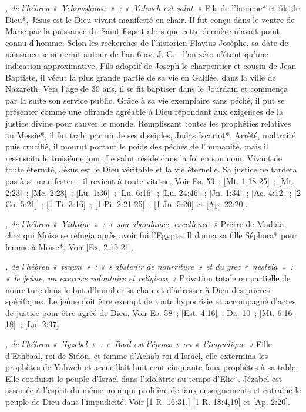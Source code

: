 \begin{multicols}{2}
\textit{, de l'hébreu «~Yehowshuwa~»~: «~Yahweh est salut~»}\newline
Fils de l'homme* et fils de Dieu*, Jésus est le Dieu vivant manifesté en chair. Il fut conçu dans le ventre de Marie par la puissance du Saint-Esprit alors que cette dernière n'avait point connu d'homme. Selon les recherches de l'historien Flavius Josèphe, sa date de naissance se situerait autour de l'an 6 av. J.-C. - l'an zéro n'étant qu'une indication approximative. Fils adoptif de Joseph le charpentier et cousin de Jean Baptiste, il vécut la plus grande partie de sa vie en Galilée, dans la ville de Nazareth. Vers l'âge de 30 ans, il se fit baptiser dans le Jourdain et commença par la suite son service public. Grâce à sa vie exemplaire sans péché, il put se présenter comme une offrande agréable à Dieu répondant aux exigences de la justice divine pour sauver le monde. Remplissant toutes les prophéties relatives au Messie*, il fut trahi par un de ses disciples, Judas Iscariot*. Arrêté, maltraité puis crucifié, il mourut portant le poids des péchés de l'humanité, mais il ressuscita le troisième jour. Le salut réside dans la foi en son nom. Vivant de toute éternité, Jésus est le Dieu véritable et la vie éternelle. Sa justice ne tardera pas à se manifester~: il revient à toute vitesse. Voir Es. 53~; \vref{Mt. 1:18-25}~; \vref{Mt. 2:23}~; \vref{Mc. 2:28}~; \vref{Lu. 1:36}~; \vref{Lu. 6:16}~; \vref{Lu. 24:46}~; \vref{Jn. 1:34}~; \vref{Ac. 4:12}~; \vref{2 Co. 5:21}~; \vref{1 Ti. 3:16}~; \vref{1 Pi. 2:21-25}~; \vref{1 Jn. 5:20} et \vref{Ap. 22:20}.

\textit{, de l'hébreu «~Yithrow~»~: «~son abondance, excellence~»}\newline
Prêtre de Madian chez qui Moise se réfugia après avoir fui l'Egypte. Il donna sa fille Séphora* pour femme à Moïse*. Voir \vref{Ex. 2:15-21}.

\textit{, de l'hébreu «~tsuwn~»~: «~s'abstenir de nourriture~» et du grec «~nesteia~»~: «~le jeûne, un exercice volontaire et religieux~»}\newline
Privation totale ou partielle de nourriture dans le but d'humilier sa chair et d'adresser à Dieu des prières spécifiques. Le jeûne doit être exempt de toute hypocrisie et accompagné d'actes de justice pour être agréé de Dieu. Voir Es. 58~; \vref{Est. 4:16}~; Da. 10~; \vref{Mt. 6:16-18}~; \vref{Lu. 2:37}.

\textit{, de l'hébreu «~'Iyzebel~»~: «~Baal est l'époux~» ou «~l'impudique~»}\newline
Fille d'Ethbaal, roi de Sidon, et femme d'Achab roi d'Israël, elle extermina les prophètes de Yahweh et accueillait huit cent cinquante faux prophètes à sa table. Elle conduisit le peuple d'Israël dans l'idolâtrie au temps d'Elie*. Jézabel est associée à l'esprit du même nom qui prolifère de faux enseignements et entraîne le peuple de Dieu dans l'impudicité. Voir \vref{1 R. 16:31,} \vref{1 R. 18:4,19} et \vref{Ap. 2:20}.


\end{multicols}
